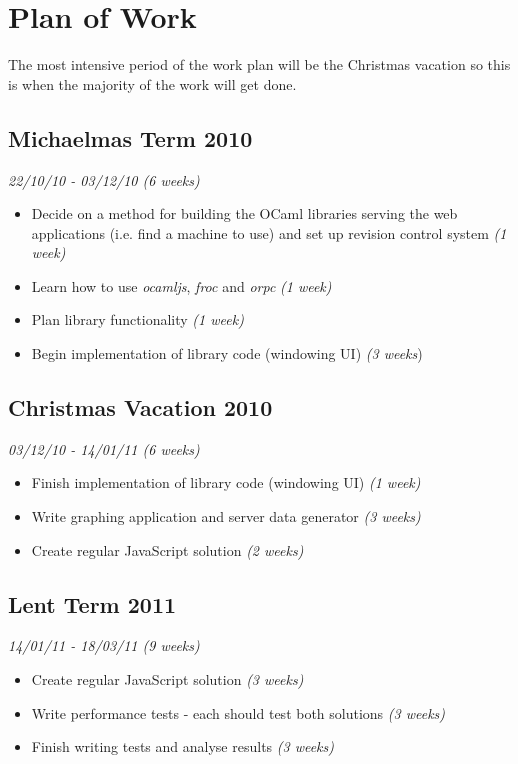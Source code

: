 \documentclass[10pt,a4paper]{article}
\begin{document}
  \section{Plan of Work}
    The most intensive period of the work plan will be the Christmas vacation so this is when the majority of the work will get done.
  \subsection{Michaelmas Term 2010}
    \emph{22/10/10 - 03/12/10 (6 weeks)}
    \begin{itemize}
      \item Decide on a method for building the OCaml libraries serving the web applications (i.e. find a machine to use) and set up revision control system \emph{(1 week)}
      \item Learn how to use \emph{ocamljs}, \emph{froc} and \emph{orpc} \emph{(1 week)}
      \item Plan library functionality \emph{(1 week)}
      \item Begin implementation of library code (windowing UI) \emph{(3 weeks})
    \end{itemize}
  \subsection{Christmas Vacation 2010}
    \emph{03/12/10 - 14/01/11 (6 weeks)}
    \begin{itemize}
      \item Finish implementation of library code (windowing UI) \emph{(1 week)}
      \item Write graphing application and server data generator \emph{(3 weeks)}
      \item Create regular JavaScript solution \emph{(2 weeks)}
    \end{itemize}
  \subsection{Lent Term 2011}
    \emph{14/01/11 - 18/03/11 (9 weeks)}
    \begin{itemize}
      \item Create regular JavaScript solution \emph{(3 weeks)}
      \item Write performance tests - each should test both solutions \emph{(3 weeks)}
      \item Finish writing tests and analyse results \emph{(3 weeks)}
    \end{itemize}
\end{document}
